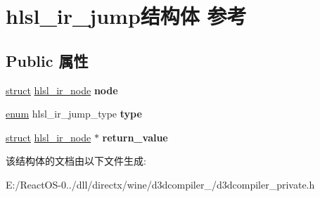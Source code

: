 \hypertarget{structhlsl__ir__jump}{}\section{hlsl\+\_\+ir\+\_\+jump结构体 参考}
\label{structhlsl__ir__jump}
\subsection*{Public 属性}
\begin{DoxyCompactItemize}
\item 
\mbox{\label{structhlsl__ir__jump_a1a38ac81b2ba34866694c741681161f9}} 
\hyperlink{interfacestruct}{struct} \hyperlink{structhlsl__ir__node}{hlsl\+\_\+ir\+\_\+node} {\bfseries node}
\item 
\mbox{\label{structhlsl__ir__jump_ab14ffebf58ce4c6017f67327f4075b19}} 
\hyperlink{interfaceenum}{enum} hlsl\+\_\+ir\+\_\+jump\+\_\+type {\bfseries type}
\item 
\mbox{\label{structhlsl__ir__jump_aa1c2edaf296706a9b6b9b1029460b2a2}} 
\hyperlink{interfacestruct}{struct} \hyperlink{structhlsl__ir__node}{hlsl\+\_\+ir\+\_\+node} $\ast$ {\bfseries return\+\_\+value}
\end{DoxyCompactItemize}


该结构体的文档由以下文件生成\+:\begin{DoxyCompactItemize}
\item 
E\+:/\+React\+O\+S-\/0../dll/directx/wine/d3dcompiler\+\_/d3dcompiler\+\_\+private.\+h\end{DoxyCompactItemize}
